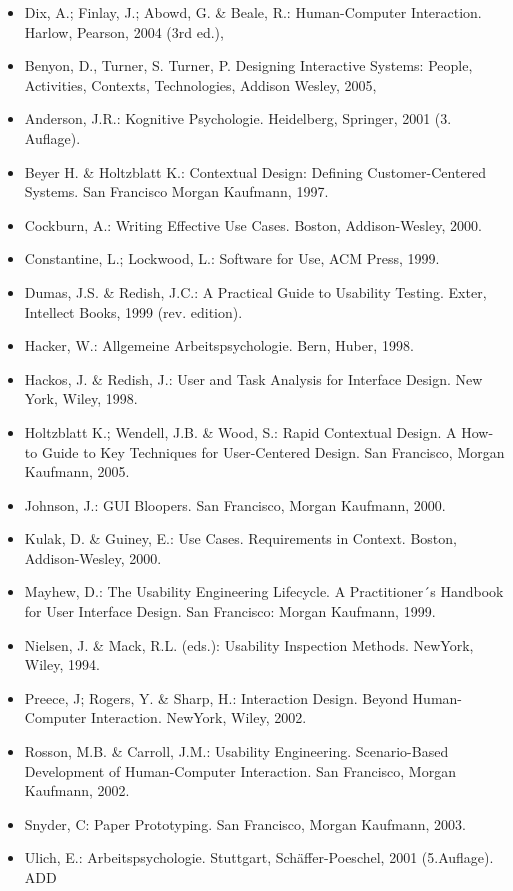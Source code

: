 \begin{itemize}
\tightlist
\item
  Dix, A.; Finlay, J.; Abowd, G. \& Beale, R.: Human-Computer
  Interaction. Harlow, Pearson, 2004 (3rd ed.),
\item
  Benyon, D., Turner, S. Turner, P. Designing Interactive Systems:
  People, Activities, Contexts, Technologies, Addison Wesley, 2005,
\item
  Anderson, J.R.: Kognitive Psychologie. Heidelberg, Springer, 2001 (3.
  Auflage).
\item
  Beyer H. \& Holtzblatt K.: Contextual Design: Defining
  Customer-Centered Systems. San Francisco Morgan Kaufmann, 1997.
\item
  Cockburn, A.: Writing Effective Use Cases. Boston, Addison-Wesley,
  2000.
\item
  Constantine, L.; Lockwood, L.: Software for Use, ACM Press, 1999.
\item
  Dumas, J.S. \& Redish, J.C.: A Practical Guide to Usability Testing.
  Exter, Intellect Books, 1999 (rev. edition).
\item
  Hacker, W.: Allgemeine Arbeitspsychologie. Bern, Huber, 1998.
\item
  Hackos, J. \& Redish, J.: User and Task Analysis for Interface Design.
  New York, Wiley, 1998.
\item
  Holtzblatt K.; Wendell, J.B. \& Wood, S.: Rapid Contextual Design. A
  How-to Guide to Key Techniques for User-Centered Design. San
  Francisco, Morgan Kaufmann, 2005.
\item
  Johnson, J.: GUI Bloopers. San Francisco, Morgan Kaufmann, 2000.
\item
  Kulak, D. \& Guiney, E.: Use Cases. Requirements in Context. Boston,
  Addison-Wesley, 2000.
\item
  Mayhew, D.: The Usability Engineering Lifecycle. A Practitioner´s
  Handbook for User Interface Design. San Francisco: Morgan Kaufmann,
  1999.
\item
  Nielsen, J. \& Mack, R.L. (eds.): Usability Inspection Methods.
  NewYork, Wiley, 1994.
\item
  Preece, J; Rogers, Y. \& Sharp, H.: Interaction Design. Beyond
  Human-Computer Interaction. NewYork, Wiley, 2002.
\item
  Rosson, M.B. \& Carroll, J.M.: Usability Engineering. Scenario-Based
  Development of Human-Computer Interaction. San Francisco, Morgan
  Kaufmann, 2002.
\item
  Snyder, C: Paper Prototyping. San Francisco, Morgan Kaufmann, 2003.
\item
  Ulich, E.: Arbeitspsychologie. Stuttgart, Schäffer-Poeschel, 2001
  (5.Auflage). ADD
\end{itemize}

